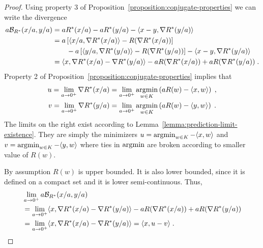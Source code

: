\begin{proof}
Using property 3 of Proposition~\ref{proposition:conjugate-properties} we can write
the divergence
\begin{align*}
a \mathcal{B}_{R^*}(x/a, y/a) & = a R^*(x/a) - a R^*(y/a) - \langle x - y, \nabla R^*(y/a) \rangle \\
& =
 a \left[ \langle x/a, \nabla R^*(x/a) \rangle - R(\nabla R^*(x/a)) \right] \\
& \qquad - a \left[ \langle y/a, \nabla R^*(y/a) \rangle - R(\nabla R^*(y/a)) \right]
- \langle x - y, \nabla R^*(y/a) \rangle \\
& =
\langle x, \nabla R^*(x/a) - \nabla R^*(y/a) \rangle - a R(\nabla R^*(x/a))
+ a R(\nabla R^*(y/a)) \; .
\end{align*}
Property 2 of Proposition~\ref{proposition:conjugate-properties} implies that
\begin{align*}
u = \lim_{a \to 0^+} \nabla R^*(x/a) & = \lim_{a \to 0^+} \operatorname*{argmin}_{w \in K} \left( a R(w) - \langle x, w \rangle \right) \; , \\
v = \lim_{a \to 0^+} \nabla R^*(y/a) & = \lim_{a \to 0^+} \operatorname*{argmin}_{w \in K} \left( a R(w) - \langle y, w \rangle \right) \; .
\end{align*}
The limits on the right exist according to
Lemma~\ref{lemma:prediction-limit-existence}.  They are simply the minimizers
$u = \operatorname*{argmin}_{w \in K} - \langle x, w \rangle$ and $v= \operatorname*{argmin}_{w \in K} -
\langle y, w \rangle$ where ties in $\operatorname*{argmin}$ are broken according to smaller
value of $R(w)$.

By assumption $R(w)$ is upper bounded. It is also lower bounded, since it is
defined on a compact set and it is lower semi-continuous. Thus,
\begin{align*}
& \lim_{a \to 0^+} a \mathcal{B}_{R^*}(x/a, y/a) \\
& = \lim_{a \to 0^+} \langle x, \nabla R^*(x/a) - \nabla R^*(y/a) \rangle - a R(\nabla R^*(x/a)) + a R(\nabla R^*(y/a)) \\
& = \lim_{a \to 0^+} \langle x, \nabla R^*(x/a) - \nabla R^*(y/a) \rangle = \langle x, u - v \rangle \; .
\end{align*}
\end{proof}
